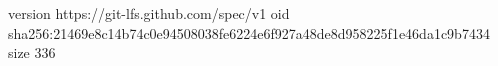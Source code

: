 version https://git-lfs.github.com/spec/v1
oid sha256:21469e8c14b74c0e94508038fe6224e6f927a48de8d958225f1e46da1c9b7434
size 336
